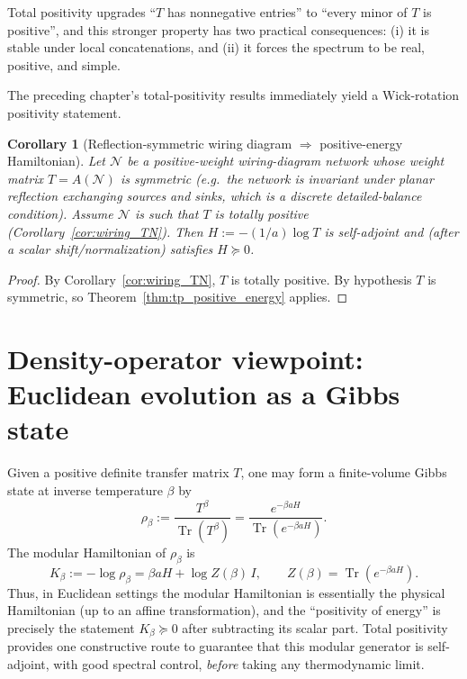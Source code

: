\documentclass[11pt,oneside]{amsbook}
\numberwithin{equation}{section}
\theoremstyle{plain}
\newtheorem{corollary}[theorem]{Corollary}
\theoremstyle{definition}
\theoremstyle{remark}
\DeclareMathOperator{\Tr}{\mathrm{Tr}}
\begin{document}
Total positivity upgrades ``$T$ has nonnegative entries'' to ``every minor of $T$ is positive'', and this stronger property has two practical consequences:
(i) it is stable under local concatenations, and
(ii) it forces the spectrum to be real, positive, and simple.

The preceding chapter's total-positivity results immediately yield a Wick-rotation positivity statement.

\begin{corollary}[Reflection-symmetric wiring diagram $\Rightarrow$ positive-energy Hamiltonian]
\label{cor:wiring_positive_energy}
Let $\mathcal{N}$ be a positive-weight wiring-diagram network whose weight matrix $T=A(\mathcal{N})$ is \emph{symmetric} (e.g.\ the network is invariant under planar reflection exchanging sources and sinks, which is a discrete detailed-balance condition).
Assume $\mathcal{N}$ is such that $T$ is totally positive (Corollary~\ref{cor:wiring_TN}).
Then $H:=-(1/a)\log T$ is self-adjoint and (after a scalar shift/normalization) satisfies $H\succeq 0$.
\end{corollary}

\begin{proof}
By Corollary~\ref{cor:wiring_TN}, $T$ is totally positive.
By hypothesis $T$ is symmetric, so Theorem~\ref{thm:tp_positive_energy} applies.
\end{proof}

\section{Density-operator viewpoint: Euclidean evolution as a Gibbs state}

Given a positive definite transfer matrix $T$, one may form a finite-volume Gibbs state at inverse temperature $\beta$ by
\[
\rho_\beta := \frac{T^\beta}{\Tr(T^\beta)} = \frac{e^{-\beta a H}}{\Tr(e^{-\beta a H})}.
\]
The modular Hamiltonian of $\rho_\beta$ is
\[
K_\beta:=-\log\rho_\beta=\beta a H+\log Z(\beta)\,I,\qquad Z(\beta)=\Tr(e^{-\beta a H}).
\]
Thus, in Euclidean settings the modular Hamiltonian is essentially the physical Hamiltonian (up to an affine transformation), and the ``positivity of energy'' is precisely the statement $K_\beta\succeq 0$ after subtracting its scalar part.
Total positivity provides one constructive route to guarantee that this modular generator is self-adjoint, with good spectral control, \emph{before} taking any thermodynamic limit.

					
					
\end{document}
